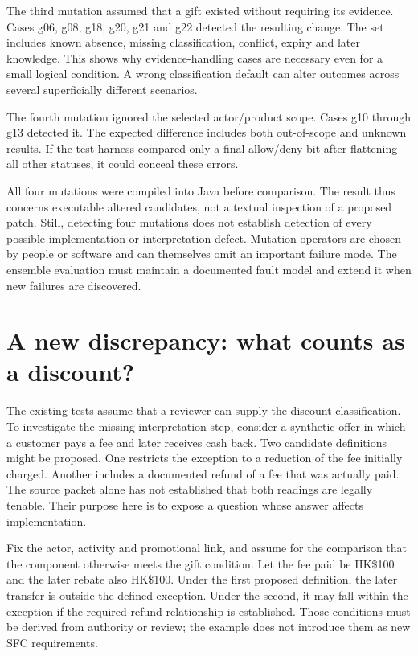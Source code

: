 \documentclass[12pt,a4paper,oneside,openany]{book}
\begin{document}
The third mutation assumed that a gift existed without requiring its evidence.
Cases g06, g08, g18, g20, g21 and g22 detected the resulting change. The set
includes known absence, missing classification, conflict, expiry and later
knowledge. This shows why evidence-handling cases are necessary even for a
small logical condition. A wrong classification default can alter outcomes
across several superficially different scenarios.

The fourth mutation ignored the selected actor/product scope. Cases g10 through
g13 detected it. The expected difference includes both out-of-scope and unknown
results. If the test harness compared only a final allow/deny bit after
flattening all other statuses, it could conceal these errors.

All four mutations were compiled into Java before comparison. The result thus
concerns executable altered candidates, not a textual inspection of a proposed
patch. Still, detecting four mutations does not establish detection of every
possible implementation or interpretation defect. Mutation operators are chosen
by people or software and can themselves omit an important failure mode. The
ensemble evaluation must maintain a documented fault model and extend it when
new failures are discovered.

\section{A new discrepancy: what counts as a discount?}
\label{merge:M02:06}

\label{sec:circular-cashback}
The existing tests assume that a reviewer can supply the discount classification.
To investigate the missing interpretation step, consider a synthetic offer in
which a customer pays a fee and later receives cash back. Two candidate
definitions might be proposed. One restricts the exception to a reduction of
the fee initially charged. Another includes a documented refund of a fee that
was actually paid. The source packet alone has not established that both
readings are legally tenable. Their purpose here is to expose a question whose
answer affects implementation.

Fix the actor, activity and promotional link, and assume for the comparison
that the component otherwise meets the gift condition. Let the fee paid be
HK\$100 and the later rebate also HK\$100. Under the first proposed definition,
the later transfer is outside the defined exception. Under the second, it may
fall within the exception if the required refund relationship is established.
Those conditions must be derived from authority or review; the example does
not introduce them as new SFC requirements.
\end{document}
